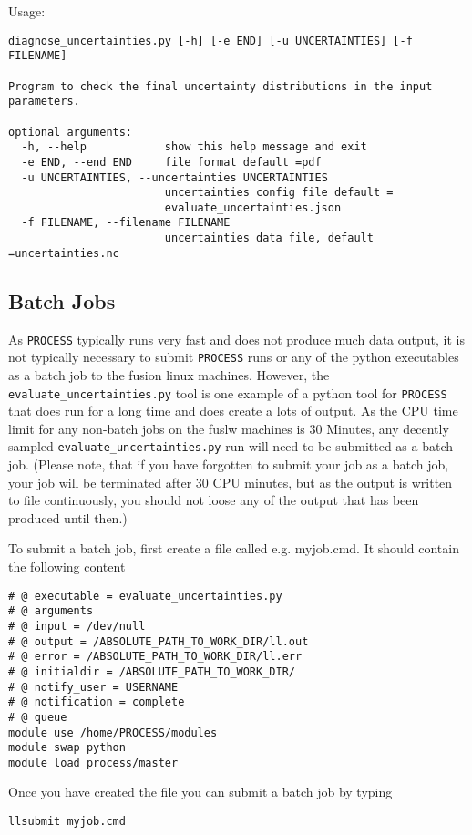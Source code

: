 \documentclass[11pt,a4paper]{article}
\newcommand{\process}{\mbox{\texttt{PROCESS}}}
\begin{document}
Usage:
\begin{verbatim}
diagnose_uncertainties.py [-h] [-e END] [-u UNCERTAINTIES] [-f FILENAME]

Program to check the final uncertainty distributions in the input parameters.

optional arguments:
  -h, --help            show this help message and exit
  -e END, --end END     file format default =pdf
  -u UNCERTAINTIES, --uncertainties UNCERTAINTIES
                        uncertainties config file default =
                        evaluate_uncertainties.json
  -f FILENAME, --filename FILENAME
                        uncertainties data file, default =uncertainties.nc

\end{verbatim}

\subsection{Batch Jobs}
As \process\/ typically runs very fast and does not produce much data output, it is not typically necessary to submit \process\/ runs or any of the python executables as a batch job to the fusion linux machines. However, the \texttt{evaluate\_uncertainties.py} tool is one example of a python tool for \process\/ that does run for a long time and does create a lots of output. As the CPU time limit for any non-batch jobs on the fuslw machines is 30 Minutes, any decently sampled \texttt{evaluate\_uncertainties.py} run will need to be submitted as a batch job. (Please note, that if you have forgotten to submit your job as a batch job, your job will be terminated after 30 CPU minutes, but as the output is written to file continuously, you should not loose any of the output that has been produced until then.)

To submit a batch job, first create a file called e.g. myjob.cmd. It should contain the following content
\begin{verbatim}
# @ executable = evaluate_uncertainties.py
# @ arguments
# @ input = /dev/null
# @ output = /ABSOLUTE_PATH_TO_WORK_DIR/ll.out
# @ error = /ABSOLUTE_PATH_TO_WORK_DIR/ll.err
# @ initialdir = /ABSOLUTE_PATH_TO_WORK_DIR/
# @ notify_user = USERNAME
# @ notification = complete
# @ queue
module use /home/PROCESS/modules
module swap python
module load process/master
\end{verbatim}
Once you have created the file you can submit a batch job by typing
\begin{verbatim}
llsubmit myjob.cmd
\end{verbatim}
\end{document}
